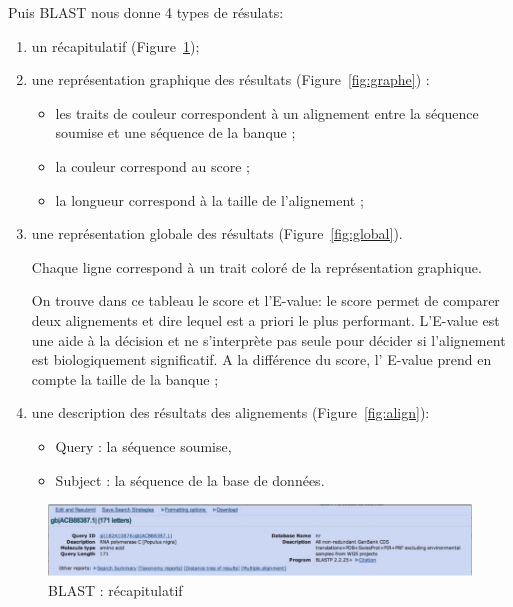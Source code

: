 \documentclass[12pt, openany]{report}
\begin{document}
	Puis BLAST nous donne 4 types de résulats:
\begin{enumerate}
\item un récapitulatif (Figure~\ref{fig:reca});
\item une représentation graphique des résultats (Figure~\ref{fig:graphe}) :
\begin{itemize}
\item les traits de couleur correspondent à un alignement entre la séquence soumise et une séquence de la banque ;
\item la couleur correspond au score ;
\item la longueur correspond à la taille de l'alignement ;
\end{itemize}

\item une représentation globale des résultats (Figure~\ref{fig:global}).

Chaque ligne correspond à un trait coloré de la représentation graphique.

On trouve dans ce tableau le score et l'E-value: le score permet de comparer deux alignements et dire lequel est a priori le plus performant. L’E-value est une aide à la décision et ne s'interprète pas seule pour décider si l'alignement est biologiquement significatif. A la différence du score, l' E-value prend en compte la taille de la banque ;

\item une description des résultats des alignements (Figure~\ref{fig:align}):
\begin{itemize}
\item Query : la séquence soumise,
\item Subject : la séquence de la base de données.
\end{itemize}
\end{enumerate}

\begin{figure}[H]
\begin{center}
    \includegraphics[scale=1]{Images/im5.png}
\caption{BLAST : récapitulatif}\label{fig:reca}
\end{center}
\end{figure}
\end{document}
